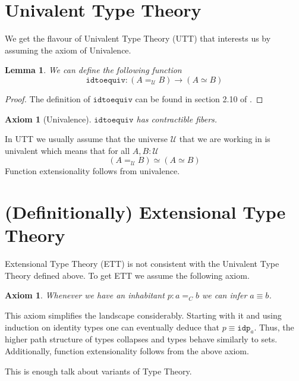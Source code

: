 \documentclass[12pt]{report}
\newtheorem{lem}[thm]{Lemma}
\newtheorem{axiom}[thm]{Axiom}
\theoremstyle{definition}
\begin{document}
\section{Univalent Type Theory}
We get the flavour of Univalent Type Theory (UTT) that interests us by assuming the axiom of Univalence.
\begin{lem}
We can define the following function
$$\mathtt{idtoequiv} : (A=_\mathcal{U}B) \rightarrow (A\simeq B)$$
\end{lem}
\begin{proof}
The definition of $\mathtt{idtoequiv}$ can be found in section 2.10 of \cite{hottbook}. 
\end{proof}

\begin{axiom}[Univalence]
$\mathtt{idtoequiv}$ has contractible fibers.
\end{axiom}
In UTT we usually assume that the universe $\mathcal{U}$ that we are working in is univalent which means that for all $A,B: \mathcal{U}$
$$(A=_\mathcal{U}B) \simeq (A \simeq B)$$
Function extensionality follows from univalence. 

\section{(Definitionally) Extensional Type Theory}
Extensional Type Theory (ETT) is not consistent with the Univalent Type Theory defined above. 
To get ETT we assume the following axiom. 
\begin{axiom}
Whenever we have an inhabitant $p : a=_C b$ we can infer $a \equiv b$. 
\end{axiom}
This axiom simplifies the landscape considerably. 
Starting with it and using induction on identity types one can eventually deduce that $p \equiv \mathtt{idp}_a$. 
Thus, the higher path structure of types collapses and types behave similarly to sets. 
Additionally, function extensionality follows from the above axiom. 

This is enough talk about variants of Type Theory. 
\end{document}
